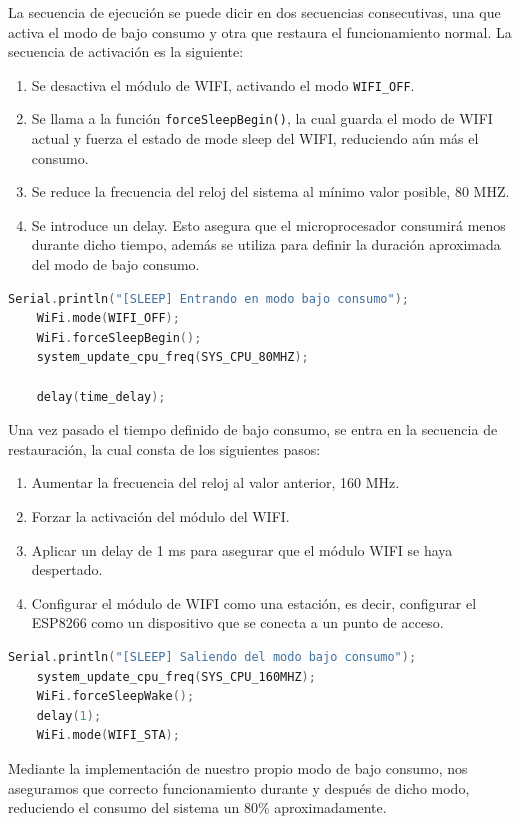 La secuencia de ejecución se puede dicir en dos secuencias consecutivas, una que activa el modo de bajo consumo y otra que restaura el funcionamiento normal. La secuencia de activación es la siguiente:

\begin{enumerate}
    \item Se desactiva el módulo de WIFI, activando el modo \texttt{WIFI\_OFF}.
    \item Se llama a la función \texttt{forceSleepBegin()}, la cual guarda el modo de WIFI actual y fuerza el estado de mode sleep del WIFI, reduciendo aún más el consumo.
    \item Se reduce la frecuencia del reloj del sistema al mínimo valor posible, 80 MHZ.
    \item Se introduce un delay. Esto asegura que el microprocesador consumirá menos durante dicho tiempo, además se utiliza para definir la duración aproximada del modo de bajo consumo.
\end{enumerate}

\begin{lstlisting}[captionpos=b, caption={Activación modo bajo consumo}, language=c++]
    Serial.println("[SLEEP] Entrando en modo bajo consumo");
    WiFi.mode(WIFI_OFF);
    WiFi.forceSleepBegin();
    system_update_cpu_freq(SYS_CPU_80MHZ);

    delay(time_delay);
\end{lstlisting}

Una vez pasado el tiempo definido de bajo consumo, se entra en la secuencia de restauración, la cual consta de los siguientes pasos:

\begin{enumerate}
    \item Aumentar la frecuencia del reloj al valor anterior, 160 MHz.
    \item Forzar la activación del módulo del WIFI.
    \item Aplicar un delay de 1 ms para asegurar que el módulo WIFI se haya despertado.
    \item Configurar el módulo de WIFI como una estación, es decir, configurar el ESP8266 como un dispositivo que se conecta a un punto de acceso.
\end{enumerate}

\begin{lstlisting}[captionpos=b, caption={Restauración modo bajo consumo}, language=c++]
    Serial.println("[SLEEP] Saliendo del modo bajo consumo");
    system_update_cpu_freq(SYS_CPU_160MHZ);
    WiFi.forceSleepWake();
    delay(1);
    WiFi.mode(WIFI_STA);
\end{lstlisting}

Mediante la implementación de nuestro propio modo de bajo consumo, nos aseguramos que correcto funcionamiento durante y después de dicho modo, reduciendo el consumo del sistema un 80\% aproximadamente.